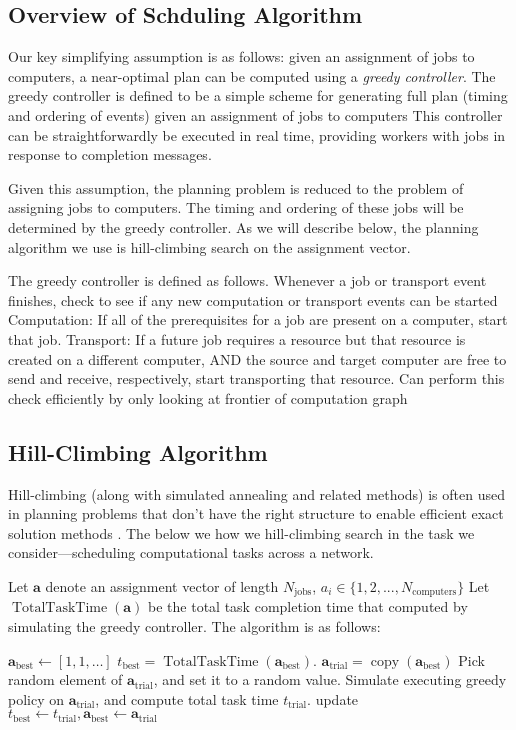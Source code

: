\documentclass[letterpaper, 10 pt, conference]{ieeeconf}  %
\newcommand{\ba}{\mathbf{a}}
\newcommand{\ncomp}{N_{\mathrm{computers}}}
\newcommand{\njobs}{N_{\mathrm{jobs}}}
\newcommand{\atrial}{\ba_{\mathrm{trial}}}
\newcommand{\abest}{\ba_{\mathrm{best}}}
\newcommand{\ttrial}{t_{\mathrm{trial}}}
\newcommand{\tbest}{t_{\mathrm{best}}}
\newcommand{\itrial}{i_{\mathrm{trial}}}
\newcommand{\ntrials}{N_{\mathrm{trials}}}
\begin{document}
\subsection{Overview of Schduling Algorithm}


Our key simplifying assumption is as follows: given an assignment of jobs to computers, a near-optimal plan can be computed using a \textit{greedy controller}.
The greedy controller is defined to be a simple scheme for generating full plan (timing and ordering of events) given an assignment of jobs to computers
This controller can be straightforwardly be executed in real time, providing workers with jobs in response to completion messages.


Given this assumption, the planning problem is reduced to the problem of assigning jobs to computers. 
The timing and ordering of these jobs will be determined by the greedy controller.
As we will describe below, the planning algorithm we use is hill-climbing search on the assignment vector.

The greedy controller is defined as follows.
Whenever a job or transport event finishes, check to see if any new computation or transport events can be started
Computation: If all of the prerequisites for a job are present on a computer, start that job.
Transport: If a future job requires a resource but that resource is created on a different computer, AND the source and target computer are free to send and receive, respectively, start transporting that resource.
Can perform this check efficiently by only looking at frontier of computation graph

\subsection{Hill-Climbing Algorithm}

Hill-climbing (along with simulated annealing and related methods) is often used in planning problems that don't have the right structure to enable efficient exact solution methods \cite{glover2003handbook}. The below we how we hill-climbing search in the task we consider---scheduling computational tasks across a network.

Let $\ba$ denote an assignment vector of length $\njobs$, $a_i \in \{1,2,...,\ncomp\}$
Let $\operatorname{TotalTaskTime}(\ba)$ be the total task completion time that computed by simulating the greedy controller.
The algorithm is as follows:
\begin{algorithmic}
\State $\abest \gets [1, 1, \dots]$
\State $t_{\mathrm{best}} = \operatorname{TotalTaskTime}(\abest)$.
\For{$\itrial \gets 1,2,\dots,\ntrials$}
\State $\ba_{\mathrm{trial}} = \operatorname{copy}(\ba_{\mathrm{best}})$
\State Pick random element of $\atrial$, and set it to a random value.
\State Simulate executing greedy policy on $\atrial$, and compute total task time $\ttrial$.
\If{$\ttrial < \tbest$} 
	update $\tbest \gets \ttrial, \abest \gets \atrial$
\EndIf
\EndFor
\end{algorithmic}
\end{document}
